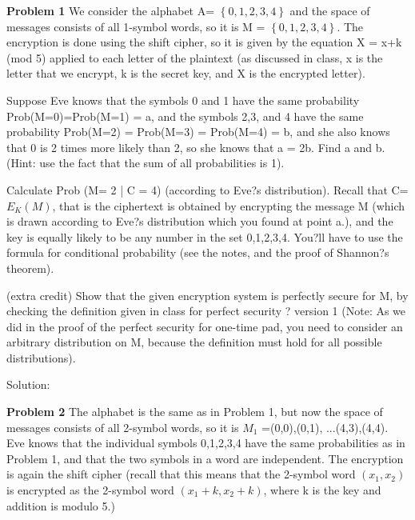 \documentclass[12pt,letterpaper,final]{report}
\begin{document}

\vline


\noindent\textbf{Problem 1}
We consider the alphabet A= $\left\{0,1,2,3,4\right\}$ and the space of messages consists of all 1-symbol words, so it is M = $\left\{0,1,2,3,4\right\}$. The encryption is done using the shift cipher, so it is given by the equation X = x+k (mod 5) applied to each letter of the plaintext (as discussed in class, x is the letter that we encrypt, k is the secret key, and X is the encrypted letter).  

\bigskip
{}
\begin{alphalist}
	\item Suppose Eve knows that the symbols 0 and 1 have the same probability Prob(M=0)=Prob(M=1) = a, and the symbols 2,3, and 4 have the same probability Prob(M=2) = Prob(M=3) = Prob(M=4) = b, and she also knows that 0 is 2 times more likely than 2, so she knows that a = 2b.  Find a and b. (Hint: use the fact that the sum of all probabilities is 1).
	\item Calculate Prob (M= 2 | C = 4)  (according to Eve?s distribution).  Recall that C= $E_{K}(M)$, that is the ciphertext is obtained by encrypting the message M (which is drawn according to Eve?s distribution which you found at point a.), and the key is equally likely to be any number in the set {0,1,2,3,4}. You?ll have to use the formula for conditional probability (see the notes, and the proof of Shannon?s theorem).
	\item (extra credit) Show that the given encryption system is perfectly secure for M, by checking the definition given in class for perfect security ? version 1 (Note: As we did in the proof of the perfect security for  one-time pad, you need to consider an arbitrary distribution on M, because the definition must hold for all possible distributions).
\end{alphalist}
\bigskip
	Solution:

\bigskip
\noindent\textbf{Problem 2} The alphabet is the same as in Problem 1, but now the space of messages consists of all 2-symbol words, so it is $M_{1}$ ={(0,0),(0,1), ...(4,3),(4,4)}. Eve knows that the individual symbols 0,1,2,3,4 have the same probabilities as in Problem 1, and that the two symbols in a word are independent. The encryption is again the shift cipher (recall that this means that the 2-symbol word
 $(x_{1}, x_{2})$ is encrypted as the 2-symbol word  $(x_{1}+k, x_{2}+k)$, where k is the key and addition is modulo 5.)
\end{document}
